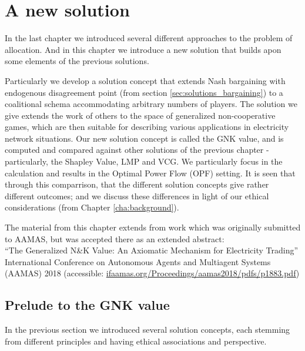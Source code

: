 \chapter{A new solution}
\label{cha:new_solution}

In the last chapter we introduced several different approaches to the problem of allocation.
And in this chapter we introduce a new solution that builds apon some elements of the previous solutions.

Particularly we develop a solution concept that extends Nash bargaining with endogenous disagreement point (from section \ref{sec:solutions_bargaining}) to a coalitional schema accommodating arbitrary numbers of players.
The solution we give extends the work of others to the space of generalized non-cooperative games, which are then suitable for describing various applications in electricity network situations.
Our new solution concept is called the GNK value, and is computed and compared against other solutions of the previous chapter - particularly, the Shapley Value, LMP and VCG.
We particularly focus in the calculation and results in the Optimal Power Flow (OPF) setting.
It is seen that through this comparrison, that the different solution concepts give rather different outcomes; and we discuss these differences in light of our ethical considerations (from Chapter \ref{cha:background}).

The material from this chapter extends from work which was originally submitted to AAMAS, but was accepted there as an extended abstract: \\
\-\hspace{5mm}``The Generalized N\&K Value: An Axiomatic Mechanism for Electricity Trading''\\ International Conference on Autonomous Agents and Multiagent Systems\\ (AAMAS) 2018 (accessible: \href{ifaamas.org/Proceedings/aamas2018/pdfs/p1883.pdf}{ifaamas.org/Proceedings/aamas2018/pdfs/p1883.pdf})


\section{Prelude to the GNK value}

In the previous section we introduced several solution concepts, each stemming from different principles and having ethical associations and perspective.

